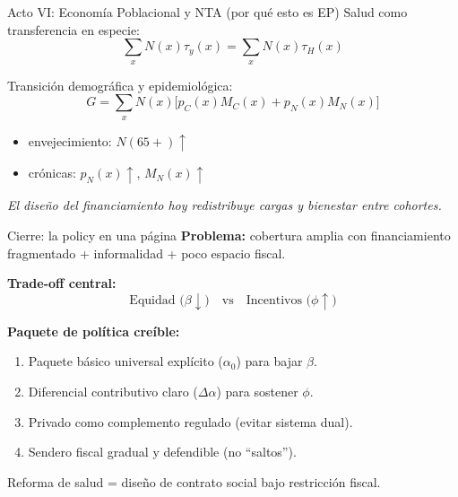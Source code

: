 \documentclass[10pt]{beamer}
\begin{document}

\begin{frame}{Acto VI: Economía Poblacional y NTA (por qué esto es EP)}
Salud como transferencia en especie:
\[
\sum_x N(x)\tau_y(x) = \sum_x N(x)\tau_H(x)
\]

\bigskip
Transición demográfica y epidemiológica:
\[
G = \sum_x N(x)\Big[p_C(x)M_C(x)+p_N(x)M_N(x)\Big]
\]

\begin{itemize}
  \item envejecimiento: \(N(65+)\uparrow\)
  \item crónicas: \(p_N(x)\uparrow\), \(M_N(x)\uparrow\)
\end{itemize}

\bigskip
\emph{El diseño del financiamiento hoy redistribuye cargas y bienestar entre cohortes.}
\end{frame}

\begin{frame}{Cierre: la policy en una página}
\textbf{Problema:} cobertura amplia con financiamiento fragmentado + informalidad + poco espacio fiscal.

\bigskip
\textbf{Trade-off central:}
\[
\text{Equidad (}\beta\downarrow\text{)} \quad \text{vs} \quad \text{Incentivos (}\phi\uparrow\text{)}
\]

\bigskip
\textbf{Paquete de política creíble:}
\begin{enumerate}
  \item Paquete básico universal explícito (\(\alpha_0\)) para bajar \(\beta\).
  \item Diferencial contributivo claro (\(\Delta\alpha\)) para sostener \(\phi\).
  \item Privado como complemento regulado (evitar sistema dual).
  \item Sendero fiscal gradual y defendible (no “saltos”).
\end{enumerate}

\bigskip
\centering
\Large
Reforma de salud = diseño de contrato social bajo restricción fiscal.
\end{frame}
\end{document}
